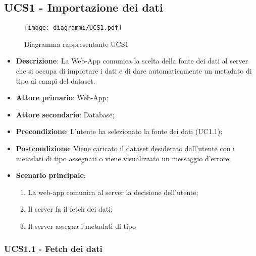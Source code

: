 \subsection{UCS1 - Importazione dei dati}
\label{sub:ucs1}


\begin{figure}[h]
    \centering
    \texttt{[image: diagrammi/UCS1.pdf]}
    \caption{Diagramma rappresentante UCS1}
    \label{fig:UCS1}
\end{figure}

\begin{itemize}
    \item \textbf{Descrizione}: La Web-App comunica la scelta della fonte dei dati al server che si occupa di importare i dati e di dare automaticamente un metadato di tipo ai campi del dataset.
	
    \item \textbf{Attore primario}: Web-App;
	\item \textbf{Attore secondario}: Database;
        
    \item \textbf{Precondizione}:   L'utente ha selezionato la fonte dei dati (UC1.1);

    \item \textbf{Postcondizione}:  Viene caricato il dataset desiderato dall'utente con i metadati di tipo assegnati o viene visualizzato un messaggio d'errore;

	\item \textbf{Scenario principale}:
		\begin{enumerate}
			\item La web-app comunica al server la decisione dell'utente;
            \item Il server fa il fetch dei dati;
			\item Il server assegna i metadati di tipo
        \end{enumerate}
   
\end{itemize}

\subsubsection{UCS1.1 - Fetch dei dati}

